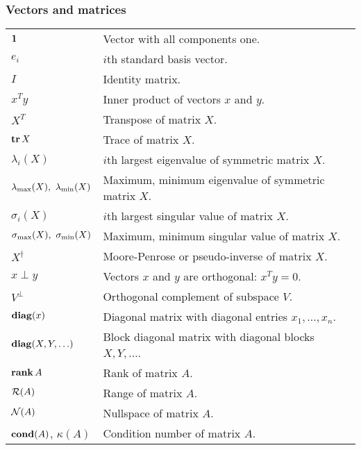 \subsubsection*{Vectors and matrices}
\begin{longtable}{p{}p{}}
    ${\bf 1{}}$ & Vector with all components one.\\
    $e_i$ & $i$th standard basis vector.\\
    $I$ & Identity matrix.\\
    $x^T y$ & Inner product of vectors $x$ and $y$.\\
    $X^T$ & Transpose of matrix $X$.\\
    $\mathop{\bf tr} X$ & Trace of matrix $X$.\\
    $\lambda_i(X)$ & $i$th largest eigenvalue of symmetric matrix $X$.\\
    $\lambdamax(X),\ \lambdamin(X)$ & Maximum, minimum eigenvalue of symmetric matrix $X$.\\
    $\sigma_i(X)$ & $i$th largest singular value of matrix $X$.\\
    $\sigmamax(X),\ \sigmamin(X)$ & Maximum, minimum singular value of matrix $X$.\\
    $X^\dagger$ & Moore-Penrose or pseudo-inverse of matrix $X$.\\
    $x \perp y$ & Vectors $x$ and $y$ are orthogonal: $x^T y = 0$.\\
    $V^\perp$ & Orthogonal complement of subspace $V$.\\
    $\mathop{\bf diag}(x)$ & Diagonal matrix with diagonal entries $x_1, \ldots, x_n$.\\
    $\mathop{\bf diag}(X, Y, \ldots)$ & Block diagonal matrix with diagonal blocks $X, Y, \ldots$.\\
    $\mathop{\bf rank} A$ & Rank of matrix $A$.\\
    $\mathop{\cal R{}}(A)$ & Range of matrix $A$.\\
    $\mathop{\cal N{}}(A)$ & Nullspace of matrix $A$.\\
    $\mathop{\bf cond}(A)$, $\kappa(A)$ & Condition number of matrix $A$.\\
\end{longtable}


